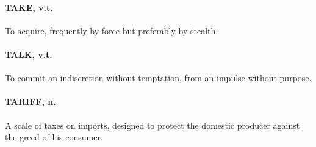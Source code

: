 \documentclass[11pt]{article}
\begin{document}
\paragraph{TAKE, v.t.}  To acquire, frequently by force but preferably by stealth.

\paragraph{TALK, v.t.}  To commit an indiscretion without temptation, from an
impulse without purpose.

\paragraph{TARIFF, n.}  A scale of taxes on imports, designed to protect the
domestic producer against the greed of his consumer.
\end{document}
